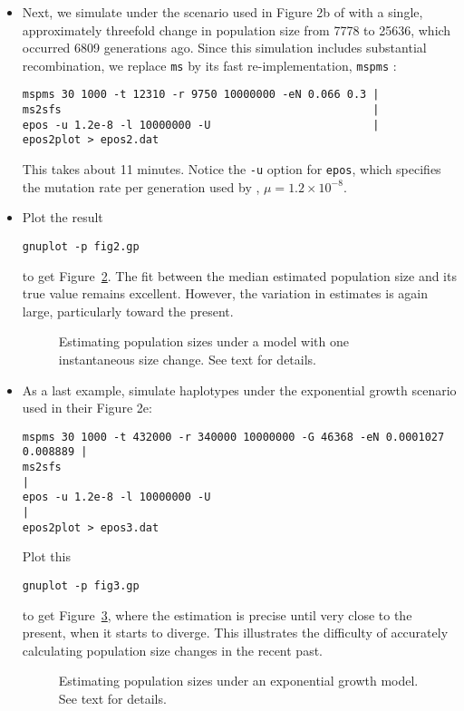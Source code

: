 \documentclass[a4paper, english]{article}
\newcommand{\ty}{\texttt}
\begin{document}
\begin{itemize}
\begin{figure}
{  text.}\label{fig:con}
\end{figure}
\item Next, we simulate under the scenario used in Figure 2b of \cite{liu15:exp}
  with a single, approximately threefold change in population size
  from 7778 to 25636, which occurred 6809 generations ago. Since this simulation includes substantial recombination, we
  replace \ty{ms} by its fast re-implementation, \ty{mspms}
  \citep{kel16:eff}:
\begin{verbatim}
mspms 30 1000 -t 12310 -r 9750 10000000 -eN 0.066 0.3 |
ms2sfs                                                |
epos -u 1.2e-8 -l 10000000 -U                         |
epos2plot > epos2.dat
\end{verbatim}
This takes about 11 minutes. Notice the \ty{-u} option for \ty{epos},
which specifies the mutation rate per generation used by \cite{liu15:exp}, $\mu=1.2\times
10^{-8}$.
\item Plot the result
\begin{verbatim}
gnuplot -p fig2.gp
\end{verbatim}
to get Figure~\ref{fig:2b}. The fit between the median estimated
population size and its true value remains excellent. However, the
variation in estimates is again large, particularly toward the present.
\begin{figure}
  \begin{center}
    \scalebox{0.6}{}
  \end{center}
  \caption{Estimating population sizes under a model with one
    instantaneous size change. See text for details.}\label{fig:2b}
\end{figure}
\item As a last example, simulate haplotypes under
  the exponential growth scenario \cite{liu15:exp} used in their
  Figure 2e:
    \small
\begin{verbatim}
mspms 30 1000 -t 432000 -r 340000 10000000 -G 46368 -eN 0.0001027 0.008889 |
ms2sfs                                                                     |
epos -u 1.2e-8 -l 10000000 -U                                              |
epos2plot > epos3.dat
\end{verbatim}
\normalsize
Plot this
\begin{verbatim}
gnuplot -p fig3.gp
\end{verbatim}
to get Figure~\ref{fig:2e}, where the estimation is precise until very
close to the present, when it starts to diverge. This illustrates
the difficulty of accurately calculating population size changes
in the recent past.
\begin{figure}
  \begin{center}
    \scalebox{0.6}{}
  \end{center}
  \caption{Estimating population sizes under an exponential growth
    model. See text for details.}\label{fig:2e}
\end{figure}
\end{itemize}
\end{document}
